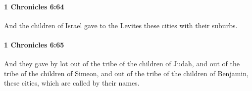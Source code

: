 		\paragraph{1 Chronicles 6:64} %
			\label{1CHRONICLES-6-64}

			And the children of Israel gave to the Levites these cities with their suburbs.


		\paragraph{1 Chronicles 6:65} %
			\label{1CHRONICLES-6-65}

			And they gave by lot out of the tribe of the children of Judah, and out of the tribe of the children of Simeon, and out of the tribe of the children of Benjamin, these cities, which are called by their names.


